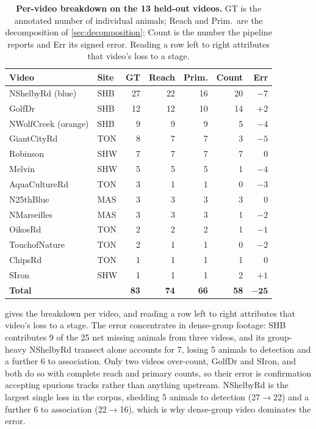 \begin{table}[H]
\caption{\textbf{Per-video breakdown on the 13 held-out videos.} GT is the annotated
number of individual animals; Reach and Prim.\ are the decomposition of
\cref{sec:decomposition}; Count is the number the pipeline reports and Err its signed error.
Reading a row left to right attributes that video's loss to a stage.\label{tab:pervideo}}
\centering
\begin{tabularx}{\textwidth}{llRRRRR}
\toprule
\textbf{Video} & \textbf{Site} & \textbf{GT} & \textbf{Reach} & \textbf{Prim.} & \textbf{Count} & \textbf{Err} \\
\midrule
NShelbyRd (blue) & SHB & 27 & 22 & 16 & 20 & $-7$ \\
GolfDr & SHB & 12 & 12 & 10 & 14 & $+2$ \\
NWolfCreek (orange) & SHB & 9 & 9 & 9 & 5 & $-4$ \\
GiantCityRd & TON & 8 & 7 & 7 & 3 & $-5$ \\
Robinson & SHW & 7 & 7 & 7 & 7 & $0$ \\
Melvin & SHW & 5 & 5 & 5 & 1 & $-4$ \\
AquaCultureRd & TON & 3 & 1 & 1 & 0 & $-3$ \\
N25thBlue & MAS & 3 & 3 & 3 & 3 & $0$ \\
NMarseilles & MAS & 3 & 3 & 3 & 1 & $-2$ \\
OikosRd & TON & 2 & 2 & 2 & 1 & $-1$ \\
TouchofNature & TON & 2 & 1 & 1 & 0 & $-2$ \\
ChipsRd & TON & 1 & 1 & 1 & 1 & $0$ \\
SIron & SHW & 1 & 1 & 1 & 2 & $+1$ \\
\midrule
\textbf{Total} & & \textbf{83} & \textbf{74} & \textbf{66} & \textbf{58} & $\mathbf{-25}$ \\
\bottomrule
\end{tabularx}
\end{table}

 gives the breakdown per video, and reading a row left to right
attributes that video's loss to a stage. The error concentrates in dense-group footage: SHB
contributes 9 of the 25 net missing animals from three videos, and its group-heavy NShelbyRd
transect alone accounts for 7, losing 5 animals to detection and a further 6 to association.
Only two videos over-count, GolfDr and SIron, and both do so with complete reach and
primary counts, so their error is confirmation accepting spurious tracks rather than anything
upstream. NShelbyRd is the largest single loss in the corpus, shedding 5 animals to detection
(27$\to$22) and a further 6 to association (22$\to$16), which is why dense-group video
dominates the error.

